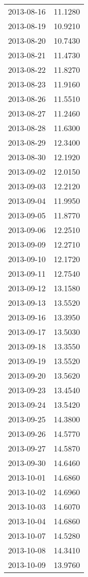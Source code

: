 \begin{tabular}{lr}
2013-08-16 &     11.1280 \\
2013-08-19 &     10.9210 \\
2013-08-20 &     10.7430 \\
2013-08-21 &     11.4730 \\
2013-08-22 &     11.8270 \\
2013-08-23 &     11.9160 \\
2013-08-26 &     11.5510 \\
2013-08-27 &     11.2460 \\
2013-08-28 &     11.6300 \\
2013-08-29 &     12.3400 \\
2013-08-30 &     12.1920 \\
2013-09-02 &     12.0150 \\
2013-09-03 &     12.2120 \\
2013-09-04 &     11.9950 \\
2013-09-05 &     11.8770 \\
2013-09-06 &     12.2510 \\
2013-09-09 &     12.2710 \\
2013-09-10 &     12.1720 \\
2013-09-11 &     12.7540 \\
2013-09-12 &     13.1580 \\
2013-09-13 &     13.5520 \\
2013-09-16 &     13.3950 \\
2013-09-17 &     13.5030 \\
2013-09-18 &     13.3550 \\
2013-09-19 &     13.5520 \\
2013-09-20 &     13.5620 \\
2013-09-23 &     13.4540 \\
2013-09-24 &     13.5420 \\
2013-09-25 &     14.3800 \\
2013-09-26 &     14.5770 \\
2013-09-27 &     14.5870 \\
2013-09-30 &     14.6460 \\
2013-10-01 &     14.6860 \\
2013-10-02 &     14.6960 \\
2013-10-03 &     14.6070 \\
2013-10-04 &     14.6860 \\
2013-10-07 &     14.5280 \\
2013-10-08 &     14.3410 \\
2013-10-09 &     13.9760 \\

\end{tabular}
